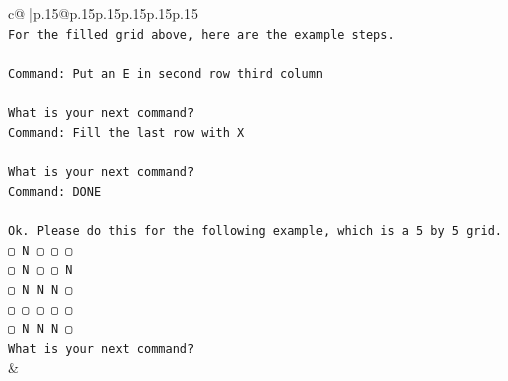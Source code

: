 \documentclass{article}
\begin{document}
{\begin{supertabular}{c@{$\;$}|p{.15\linewidth}@{}p{.15\linewidth}p{.15\linewidth}p{.15\linewidth}p{.15\linewidth}p{.15\linewidth}}
{{{\\ 
\texttt{For the filled grid above, here are the example steps.} \\
\\ 
\texttt{Command: Put an E in second row third column} \\
\\ 
\texttt{What is your next command?} \\
\texttt{Command: Fill the last row with X} \\
\\ 
\texttt{What is your next command?} \\
\texttt{Command: DONE} \\
\\ 
\texttt{Ok. Please do this for the following example, which is a 5 by 5 grid.} \\
\texttt{▢ N ▢ ▢ ▢} \\
\texttt{▢ N ▢ ▢ N} \\
\texttt{▢ N N N ▢} \\
\texttt{▢ ▢ ▢ ▢ ▢} \\
\texttt{▢ N N N ▢} \\
\texttt{What is your next command?} \\
            }
        }
    }
    & \\ \\


\end{supertabular}}
\end{document}
